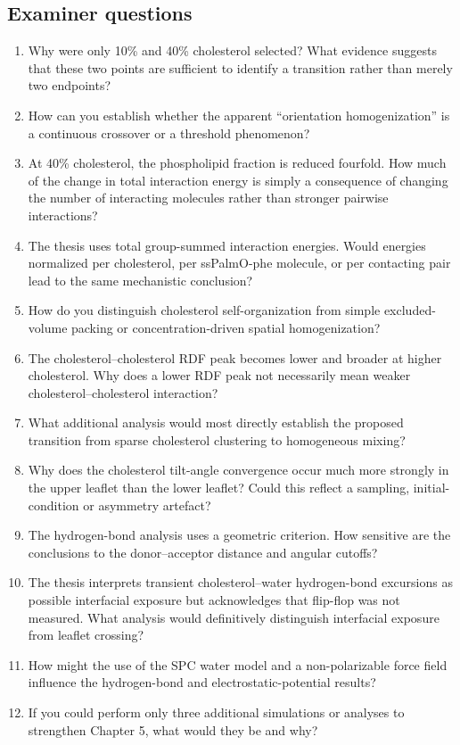 \documentclass[11pt,a4paper]{article}
\begin{document}
\subsection*{Examiner questions}

\begin{enumerate}[leftmargin=*]
\item Why were only 10\% and 40\% cholesterol selected? What evidence suggests that these two points are sufficient to identify a transition rather than merely two endpoints?
\item How can you establish whether the apparent ``orientation homogenization'' is a continuous crossover or a threshold phenomenon?
\item At 40\% cholesterol, the phospholipid fraction is reduced fourfold. How much of the change in total interaction energy is simply a consequence of changing the number of interacting molecules rather than stronger pairwise interactions?
\item The thesis uses total group-summed interaction energies. Would energies normalized per cholesterol, per ssPalmO-phe molecule, or per contacting pair lead to the same mechanistic conclusion?
\item How do you distinguish cholesterol self-organization from simple excluded-volume packing or concentration-driven spatial homogenization?
\item The cholesterol--cholesterol RDF peak becomes lower and broader at higher cholesterol. Why does a lower RDF peak not necessarily mean weaker cholesterol--cholesterol interaction?
\item What additional analysis would most directly establish the proposed transition from sparse cholesterol clustering to homogeneous mixing?
\item Why does the cholesterol tilt-angle convergence occur much more strongly in the upper leaflet than the lower leaflet? Could this reflect a sampling, initial-condition or asymmetry artefact?
\item The hydrogen-bond analysis uses a geometric criterion. How sensitive are the conclusions to the donor--acceptor distance and angular cutoffs?
\item The thesis interprets transient cholesterol--water hydrogen-bond excursions as possible interfacial exposure but acknowledges that flip-flop was not measured. What analysis would definitively distinguish interfacial exposure from leaflet crossing?
\item How might the use of the SPC water model and a non-polarizable force field influence the hydrogen-bond and electrostatic-potential results?
\item If you could perform only three additional simulations or analyses to strengthen Chapter 5, what would they be and why?
\end{enumerate}
\end{document}
